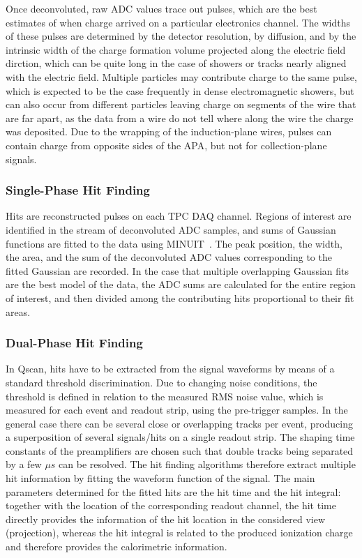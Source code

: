 Once deconvoluted, raw ADC values trace out pulses, which are the best
estimates of when charge arrived on a particular electronics channel.
The widths of these pulses are determined by the detector resolution,
by diffusion, and by the intrinsic width of the charge formation
volume projected along the electric field dirction, which can be quite
long in the case of showers or tracks nearly aligned with the electric
field.  Multiple particles may contribute charge to the same pulse,
which is expected to be the case frequently in dense electromagnetic
showers, but can also occur from different particles leaving charge on
segments of the wire that are far apart, as the data from a wire do
not tell where along the wire the charge was deposited.  
Due to the wrapping of the induction-plane wires, pulses can contain charge
from opposite sides of the APA, but not for collection-plane signals.

\subsubsection{Single-Phase Hit Finding}

Hits are reconstructed pulses on each TPC DAQ channel.  Regions of
interest are identified in the stream of deconvoluted ADC samples, and
sums of Gaussian functions are fitted to the data using
MINUIT~\cite{James:1994vla}.  The peak position, the width, the area, and the
sum of the deconvoluted ADC values corresponding to the fitted
Gaussian are recorded.  In the case that multiple overlapping Gaussian
fits are the best model of the data, the ADC sums are calculated for
the entire region of interest, and then divided among the contributing
hits proportional to their fit areas.  



\subsubsection{Dual-Phase Hit Finding}

In Qscan, hits have to be extracted from the signal waveforms by means of a standard threshold discrimination. 
Due to changing noise conditions, the threshold is defined in relation to the measured RMS noise value, 
which is measured for each event and readout strip, using the pre-trigger samples.
In the general case there can be several close or overlapping tracks per event, producing a superposition of several signals/hits on a single readout strip. 
The shaping time constants of the preamplifiers are chosen such that double tracks being separated by a few $\mu s$ can be resolved.
The hit finding algorithms therefore extract multiple hit information by fitting the waveform function of the signal.
The main parameters determined for the fitted hits are the hit time and the hit integral: 
together with the location of the corresponding readout channel, the hit time directly provides the information of the hit location in the considered view (projection), whereas the hit integral is related to the produced ionization charge and therefore provides the calorimetric information.


